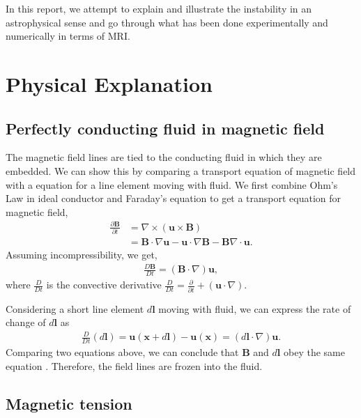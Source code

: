 \documentclass{jfm}
\newcommand{\del}{\nabla}
\begin{document}
In this report, we attempt to explain and illustrate the instability in an 
astrophysical sense and go through what has been done experimentally and 
numerically in terms of MRI.



\section{Physical Explanation}


%
%
\subsection{Perfectly conducting fluid in magnetic field}

The magnetic field lines are tied to the conducting fluid in which they are embedded.
We can show this by comparing a transport equation of magnetic field with a equation for a line element moving with fluid. 
We first combine Ohm's Law in ideal 
conductor and Faraday's equation to get a transport equation for magnetic 
field,
\begin{align}
    \frac{\partial \mathbf{B}}{\partial t} &= \del \times (\mathbf{u}\times \mathbf{B}) \nonumber \\
    &=\mathbf{B}\cdot\del \mathbf{u} - {\mathbf{u}\cdot\del}\mathbf{B} -\mathbf{B}\del\cdot\mathbf{u}.
\end{align}
Assuming incompressibility, we get,
\begin{align}
    \frac{D \mathbf{B}}{D t} = (\mathbf{B}\cdot \del) \mathbf{u},
\end{align}
where $\frac{D}{Dt}$ is the convective derivative $\frac{D}{Dt}=\frac{\partial}{\partial t}+(\mathbf{u}\cdot\del)$.

Considering a short line element $d\mathbf{l}$ moving with fluid, we can express 
the rate of change of $d\mathbf{l}$ as
\begin{align}
    \frac{D}{Dt}\left(d\mathbf{l}\right) = \mathbf{u}(\mathbf{x}+d\mathbf{l})-\mathbf{u}(\mathbf{x})=(d\mathbf{l}\cdot\del)\mathbf{u}.
\end{align}
Comparing two equations above, we can conclude that $\mathbf{B}$ and 
$d\mathbf{l}$ obey the same equation \cite[see][]{Davidson2001}. Therefore, the 
field lines are frozen into the fluid.


%
%
\subsection{Magnetic tension}
\end{document}
